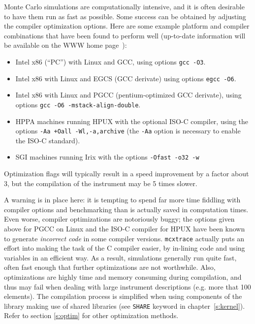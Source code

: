 Monte Carlo simulations are computationally intensive, and it is often desirable
to have them run as fast as possible. Some success can be obtained by adjusting
the compiler optimization options. Here are some example platform and compiler
combinations that have been found to perform well (up-to-date information will
be available on the \MCX WWW home page~\cite{mcxtrace_webpage}):
\begin{itemize}
\item Intel x86 (``PC'') with Linux and GCC, using options \verb+gcc -O3+.
\item Intel x86 with Linux and EGCS (GCC derivate) using
  options \verb+egcc -O6+.
\item Intel x86 with Linux and PGCC (pentium-optimized GCC derivate), using
  options \verb+gcc -O6 -mstack-align-double+.
\item HPPA machines running HPUX with the optional ISO-C compiler,
  using the options
  \verb|-Aa +Oall -Wl,-a,archive| (the \verb+-Aa+ option is necessary to
  enable the ISO-C standard).
\item SGI machines running Irix with the options
  \verb|-Ofast -o32 -w|
\end{itemize}
Optimization flags will typically result in a speed improvement by a factor
about 3, but the compilation of the instrument may be 5 times slower.

A warning is in place here: it is tempting to spend far more time fiddling with
compiler options and benchmarking than is actually saved in computation
times. Even worse, compiler optimizations are notoriously buggy; the options
given above for PGCC on Linux and the ISO-C compiler for HPUX have been known to
generate \emph{incorrect code} in some compiler versions. \texttt{mcxtrace} actually puts an
effort into making the task of the C compiler easier, by in-lining code and
using variables in an efficient way. As a result, \MCX simulations generally
run quite fast, often fast enough that further optimizations are not
worthwhile. Also, optimizations are highly time and memory consuming during
compilation, and thus may fail when dealing with large instrument descriptions
(e.g. more that 100 elements). The compilation process is simplified when using
components of the library making use of shared libraries (see \verb+SHARE+
keyword in chapter~\ref{s:kernel}). Refer to section \ref{s:optim} for other
optimization methods.


